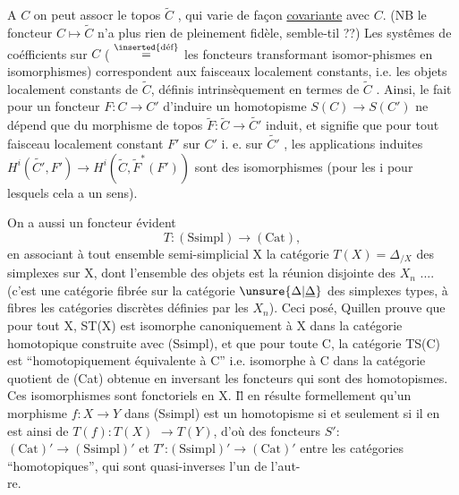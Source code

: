 A $C$ on peut assocr le topos $\widetilde{C}$ , qui varie de façon \uline{covariante} avec $C$.
(NB le foncteur $C \mapsto \widetilde{C}$ n'a plus rien de pleinement fidèle, semble-t\deleted{\unsure{-}}il ??)
Les systêmes de coéfficients  sur $C$ ( $\overset{\text{\inserted{déf}}}{=}$ les foncteurs  transformant isomor-phismes en isomorphismes) correspondent aux faisceaux localement constant\deleted{,}s,
i.e. les objets localement constants de $\widetilde{C}$, définis intrinsèquement en termes
de $\widetilde{C}$ . Ainsi, le fait pour un foncteur $F:C \to C'$ d'induire un
homotopisme $S(C) \to S(C')$ ne dépend que du morphisme de topos $\widetilde{F}: \widetilde{C} \to \widetilde{C'}$
induit, et signifie que pour tout faisceau localement constant $F'$ sur $C'$ i.
e. sur $\widetilde{C'}$ , les applications induites $H^i(\widetilde{C'},F') \longrightarrow H^i(\widetilde{C},\widetilde{F}^{*}(F'))$
sont des isomorphismes (pour les i pour lesquels cela a un sens).


On a aussi un foncteur évident
\[ T: (\mathrm{Ssimpl}) \longrightarrow (\mathrm{Cat}) , \]
en associant à tout ensemble semi-simplicial X la catégorie $T(X) = \Delta_{/X}$
des simplexes sur X, dont l'ensemble des objets est la réunion disjointe
des $X_n$ .... (c'est une catégorie fibrée sur la catégorie $\unsure{\Delta|\underline{\Delta}}$ des simplexes
types, à fibres les catégories discrètes définies par les $X_n$). Ceci posé,
Quillen prouve que pour tout X, ST(X) est isomorphe canoniquement à X dans
la catégorie homotopique construite avec (Ssimpl), et que pour toute C,
la catégorie TS(C) est  ``homotopiquement équivalente à C''  i.e.
 isomorphe à C dans la catégorie quotient de (Cat) obtenue en inversant les
foncteurs qui sont des homotopismes.  Ces isomorphismes sont
fonctoriels en X. I\={l} en résulte formellement qu'un morphisme $f:X\to Y$ dans
(Ssimpl) est un homotopisme si et seulement si il en est ainsi de $T(f):T(X)$
$\to T(Y)$, d'où des foncteurs $S'$: $(\mathrm{Cat})' \longrightarrow (\mathrm{Ssimpl})'$ et $T'$:$(\mathrm{Ssimpl})'\longrightarrow(\mathrm{Cat})'$
entre les catégories ``homotopiques'',  qui sont quasi-inverses l'un de l'aut-\\
re.

